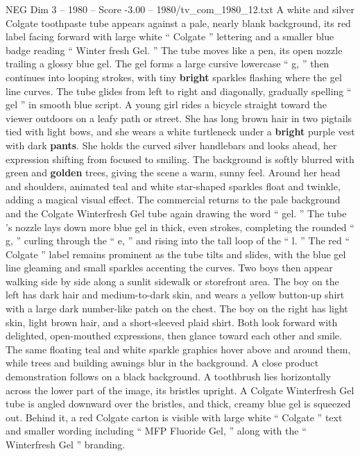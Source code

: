 \begin{textsample}{NEG Dim 3 – 1980 – Score -3.00 – 1980/tv\_com\_1980\_12.txt}  \label{ex:f3_neg_052}
A white and silver Colgate toothpaste tube appears against a pale, nearly blank background, its red label facing forward with large white “ Colgate ” lettering and a smaller blue badge reading “ Winter fresh Gel. ” The tube moves like a pen, its open nozzle trailing a glossy blue gel.
The gel forms a large cursive lowercase “ g, ” then continues into looping strokes, with tiny \textbf{bright} sparkles flashing where the gel line curves.
The tube glides from left to right and diagonally, gradually spelling “ gel ” in smooth blue script.
A young girl rides a bicycle straight toward the viewer outdoors on a leafy path or street.
She has long brown hair in two pigtails tied with light bows, and she wears a white turtleneck under a \textbf{bright} purple vest with dark \textbf{pants}.
She holds the curved silver handlebars and looks ahead, her expression shifting from focused to smiling.
The background is softly blurred with green and \textbf{golden} trees, giving the scene a warm, sunny feel.
Around her head and shoulders, animated teal and white star-shaped sparkles float and twinkle, adding a magical visual effect.
The commercial returns to the pale background and the Colgate Winterfresh Gel tube again drawing the word “ gel. ” The tube ’s nozzle lays down more blue gel in thick, even strokes, completing the rounded “ g, ” curling through the “ e, ” and rising into the tall loop of the “ l. ” The red “ Colgate ” label remains prominent as the tube tilts and slides, with the blue gel line gleaming and small sparkles accenting the curves.
Two boys then appear walking side by side along a sunlit sidewalk or storefront area.
The boy on the left has dark hair and medium-to-dark skin, and wears a yellow button-up shirt with a large dark number-like patch on the chest.
The boy on the right has light skin, light brown hair, and a short-sleeved plaid shirt.
Both look forward with delighted, open-mouthed expressions, then glance toward each other and smile.
The same floating teal and white sparkle graphics hover above and around them, while trees and building awnings blur in the background.
A close product demonstration follows on a black background.
A toothbrush lies horizontally across the lower part of the image, its bristles upright.
A Colgate Winterfresh Gel tube is angled downward over the bristles, and thick, creamy blue gel is squeezed out.
Behind it, a red Colgate carton is visible with large white “ Colgate ” text and smaller wording including “ MFP Fluoride Gel, ” along with the “ Winterfresh Gel ” branding.

\end{textsample}
